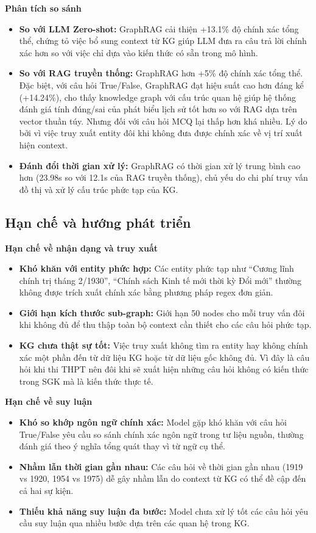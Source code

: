 \textbf{Phân tích so sánh}
\begin{itemize}
    \item \textbf{So với LLM Zero-shot:} GraphRAG cải thiện +13.1\% độ chính xác tổng thể, chứng tỏ việc bổ sung context từ KG giúp LLM đưa ra câu trả lời chính xác hơn so với việc chỉ dựa vào kiến thức có sẵn trong mô hình.
    \item \textbf{So với RAG truyền thống:} GraphRAG hơn +5\% độ chính xác tổng thể. Đặc biệt, với câu hỏi True/False, GraphRAG đạt hiệu suất cao hơn đáng kể (+14.24\%), cho thấy knowledge graph với cấu trúc quan hệ giúp hệ thống đánh giá tính đúng/sai của phát biểu lịch sử tốt hơn so với RAG dựa trên vector thuần túy. Nhưng đối với câu hỏi MCQ lại thấp hơn khá nhiều. Lý do bởi vì việc truy xuất entity đôi khi không đưa được chính xác về vị trí xuất hiện context.
    \item \textbf{Đánh đổi thời gian xử lý:} GraphRAG có thời gian xử lý trung bình cao hơn (23.98s so với 12.1s của RAG truyền thống), chủ yếu do chi phí truy vấn đồ thị và xử lý cấu trúc phức tạp của KG.
\end{itemize}

\subsection{Hạn chế và hướng phát triển}

\textbf{Hạn chế về nhận dạng và truy xuất}
\begin{itemize}
    \item \textbf{Khó khăn với entity phức hợp:} Các entity phức tạp như ``Cương lĩnh chính trị tháng 2/1930'', ``Chính sách Kinh tế mới thời kỳ Đổi mới'' thường không được trích xuất chính xác bằng phương pháp regex đơn giản.
    \item \textbf{Giới hạn kích thước sub-graph:} Giới hạn 50 nodes cho mỗi truy vấn đôi khi không đủ để thu thập toàn bộ context cần thiết cho các câu hỏi phức tạp.
    \item \textbf{KG chưa thật sự tốt:} Việc truy xuất không tìm ra entity hay không chính xác một phần đến từ dữ liệu KG hoặc từ dữ liệu gốc không đủ. Vì đây là câu hỏi khi thi THPT nên đôi khi sẽ xuất hiện những câu hỏi không có kiến thức trong SGK mà là kiến thức thực tế.
\end{itemize}

\textbf{Hạn chế về suy luận}
\begin{itemize}
    \item \textbf{Khó so khớp ngôn ngữ chính xác:} Model gặp khó khăn với câu hỏi True/False yêu cầu so sánh chính xác ngôn ngữ trong tư liệu nguồn, thường đánh giá theo ý nghĩa tổng quát thay vì từ ngữ cụ thể.
    \item \textbf{Nhầm lẫn thời gian gần nhau:} Các câu hỏi về thời gian gần nhau (1919 vs 1920, 1954 vs 1975) dễ gây nhầm lẫn do context từ KG có thể đề cập đến cả hai sự kiện.
    \item \textbf{Thiếu khả năng suy luận đa bước:} Model chưa xử lý tốt các câu hỏi yêu cầu suy luận qua nhiều bước dựa trên các quan hệ trong KG.
\end{itemize}
\\


